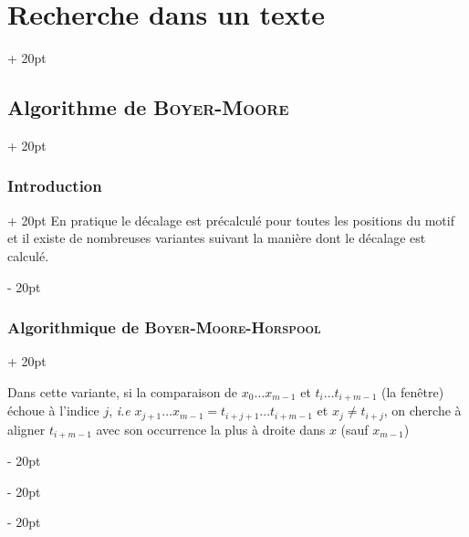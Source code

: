 \documentclass[a4paper, 12pt, twoside]{article}
\newcommand{\ind}[1][20pt]{\advance\leftskip + #1}
\newcommand{\deind}[1][20pt]{\advance\leftskip - #1}
\newenvironment{indt}[2][20pt]{#2 \par \ind[#1]}{\par \deind} %
\begin{document}
\begin{indt}{\section{Recherche dans un texte}}
\begin{indt}{\subsection{Algorithme de \textsc{Boyer-Moore}}}
\begin{indt}{\subsubsection{Introduction}}
                En pratique le décalage est précalculé pour toutes les positions du motif et il existe de nombreuses variantes suivant la manière dont le décalage est calculé.
            \end{indt}

            \vspace{12pt}
            
            \begin{indt}{\subsubsection{Algorithmique de \textsc{Boyer-Moore-Horspool}}}
                \label{1.2.2}
                
                Dans cette variante, si la comparaison de $x_0 \ldots x_{m - 1}$ et $t_i \ldots t_{i + m - 1}$ (la fenêtre) échoue à l'indice $j$, \textit{i.e} $x_{j + 1} \ldots x_{m - 1} = t_{i + j + 1} \ldots t_{i + m - 1}$ et $x_j \neq t_{i + j}$, on cherche à aligner $t_{i + m - 1}$ avec son occurrence la plus à droite dans $x$ (sauf $x_{m - 1}$)
                \begin{center}
\end{center}
\end{indt}
\end{indt}
\end{indt}
\end{document}
